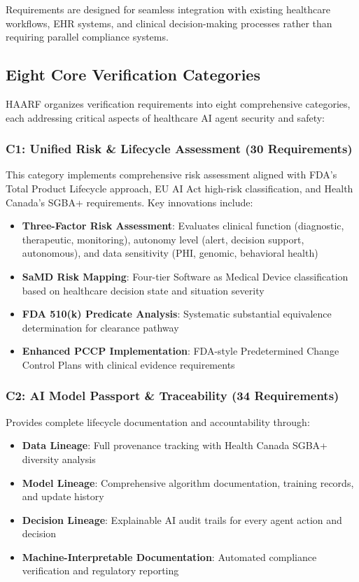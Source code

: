 \documentclass[11pt]{article}
\begin{document}
Requirements are designed for seamless integration with existing healthcare workflows, EHR systems, and clinical decision-making processes rather than requiring parallel compliance systems.

\subsection{Eight Core Verification Categories}

HAARF organizes verification requirements into eight comprehensive categories, each addressing critical aspects of healthcare AI agent security and safety:

\subsubsection{C1: Unified Risk \& Lifecycle Assessment (30 Requirements)}

This category implements comprehensive risk assessment aligned with FDA's Total Product Lifecycle approach, EU AI Act high-risk classification, and Health Canada's SGBA+ requirements. Key innovations include:

\begin{itemize}
    \item \textbf{Three-Factor Risk Assessment}: Evaluates clinical function (diagnostic, therapeutic, monitoring), autonomy level (alert, decision support, autonomous), and data sensitivity (PHI, genomic, behavioral health)
    \item \textbf{SaMD Risk Mapping}: Four-tier Software as Medical Device classification based on healthcare decision state and situation severity
    \item \textbf{FDA 510(k) Predicate Analysis}: Systematic substantial equivalence determination for clearance pathway
    \item \textbf{Enhanced PCCP Implementation}: FDA-style Predetermined Change Control Plans with clinical evidence requirements
\end{itemize}

\subsubsection{C2: AI Model Passport \& Traceability (34 Requirements)}

Provides complete lifecycle documentation and accountability through:

\begin{itemize}
    \item \textbf{Data Lineage}: Full provenance tracking with Health Canada SGBA+ diversity analysis
    \item \textbf{Model Lineage}: Comprehensive algorithm documentation, training records, and update history
    \item \textbf{Decision Lineage}: Explainable AI audit trails for every agent action and decision
    \item \textbf{Machine-Interpretable Documentation}: Automated compliance verification and regulatory reporting
\end{itemize}
\end{document}
